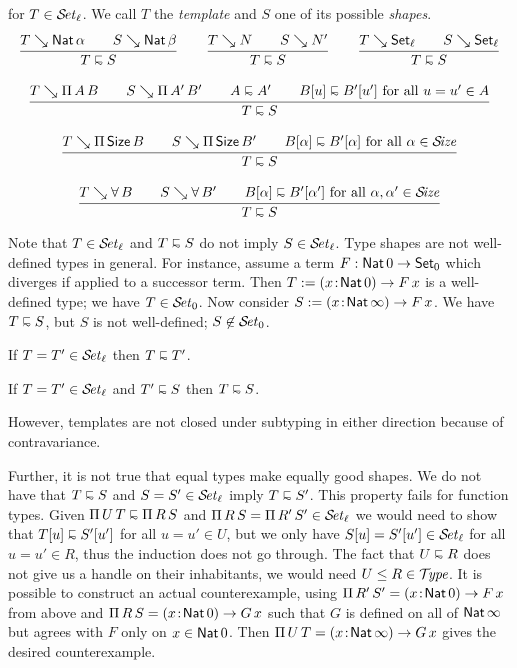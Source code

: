 \documentclass[acmlarge,review,anonymous]{acmart}\settopmatter{printfolios=true}
\begin{document}
 for $T \in \SET[\ell]$.  We call $T$ the \emph{template} and $S$ one of its possible \emph{shapes}.
\begin{gather*}
  \ru{T \evalsto \Nat \alpha \qquad
      S \evalsto \Nat \beta
    }{T \shape S}
\qquad
  \ru{T \evalsto N \qquad
      S \evalsto N'
    }{T \shape S}
\qquad
   \ru{T \evalsto \Set[\ell] \qquad
       S \evalsto \Set[\ell]
    }{T \shape S}
\\[2ex]
  \ru{T \evalsto \piT A B \qquad
      S \evalsto \piT{A'}{B'} \qquad
      A \shape A' \qquad
      B[u] \shape B'[u'] \mforall u = u' \in A
    }{T \shape S}
\\[2ex]
  \ru{T \evalsto \piT \Size B \qquad
      S \evalsto \piT{\Size}{B'} \qquad
      B[\alpha] \shape B'[\alpha] \mforall \alpha \in \SIZE
    }{T \shape S}
\\[2ex]
  \ru{T \evalsto \forallT B \qquad
      S \evalsto \forallT{B'} \qquad
      B[\alpha] \shape B'[\alpha'] \mforall \alpha,\alpha' \in \SIZE
    }{T \shape S}
\end{gather*}

Note that $T \in \SET[\ell]$ and $T \shape S$ do not imply $S \in \SET[\ell]$.
Type shapes are not well-defined types in general.
For instance, assume a term $F : \Nat 0 \to \Set[0]$ which diverges if applied to a successor term.
Then $T := \funT x {\Nat 0} {F\,x}$ is a well-defined type; we have $T \in \SET[0]$.
Now consider $S := \funT x {\Nat \infty} {F\,x}$.
We have $T \shape S$, but $S$ is not well-defined; $S \not\in \SET[0]$.

\begin{lemma}
  If\/ $T = T' \in \SET[\ell]$ then $T \shape T'$.
\end{lemma}

\begin{lemma}
  If\/ $T = T' \in \SET[\ell]$ and $T' \shape S$ then $T \shape S$.
\end{lemma}

However, templates are not closed under subtyping in either direction because of contravariance.

Further, it is not true that equal types make equally good shapes.  We do not have that
$T \shape S$ and $S = S' \in \SET[\ell]$ imply $T \shape S'$.  This property fails for function types.
Given $\piT U T \shape \piT R S$ and $\piT R S = \piT {R'}{S'} \in \SET[\ell]$ we would need to show that $T[u] \shape S'[u']$ for all $u = u' \in U$, but we only have $S[u] = S'[u'] \in \SET[\ell]$ for all $u = u' \in R$, thus the induction does not go through.  The fact that $U \shape R$ does not give us a handle on their inhabitants, we would need $U \leq R \in \TYPE$.
It is possible to construct an actual counterexample, using
$\piT {R'} S' =  \funT x {\Nat 0} {F\,x}$ from above and $\piT R S = \funT x {\Nat 0} {G\,x}$
such that $G$ is defined on all of $\Nat \infty$ but agrees with $F$ only on $x \in \Nat 0$.
Then $\piT U T = \funT x {\Nat \infty} {G\,x}$ gives the desired counterexample.
\end{document}

